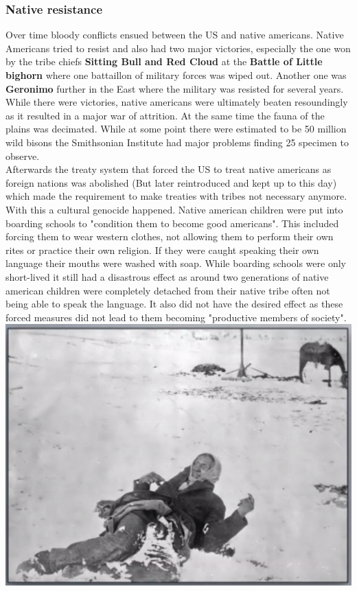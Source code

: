 \documentclass{article}
\begin{document}
	\subsubsection{Native resistance}
	Over time bloody conflicts ensued between the US and native americans. Native Americans tried to resist and also had two major victories, especially the one won by the tribe chiefs \textbf{Sitting Bull and Red Cloud} at the \textbf{Battle of Little bighorn} where one battaillon of military forces was wiped out. Another one was \textbf{Geronimo} further in the East where the military was resisted for several years.
	While there were victories, native americans were ultimately beaten resoundingly as it resulted in a major war of attrition. At the same time the fauna of the plains was decimated. While at some point there were estimated to be 50 million wild bisons the Smithsonian Institute had major problems finding 25 specimen to observe. \\
	Afterwards the treaty system that forced the US to treat native americans as foreign nations was abolished (But later reintroduced and kept up to this day) which made the requirement to make treaties with tribes not necessary anymore. \\
	With this a cultural genocide happened. Native american children were put into boarding schools to "condition them to become good americans". This included forcing them to wear western clothes, not allowing them to perform their own rites or practice their own religion. If they were caught speaking their own language their mouths were washed with soap. While boarding schools were only short-lived it still had a disastrous effect as around two generations of native american children were completely detached from their native tribe often not being able to speak the language. It also did not have the desired effect as these forced measures did not lead to them becoming "productive members of society". \\
	\includegraphics{Wounded_Knee.png} \\
\end{document}
